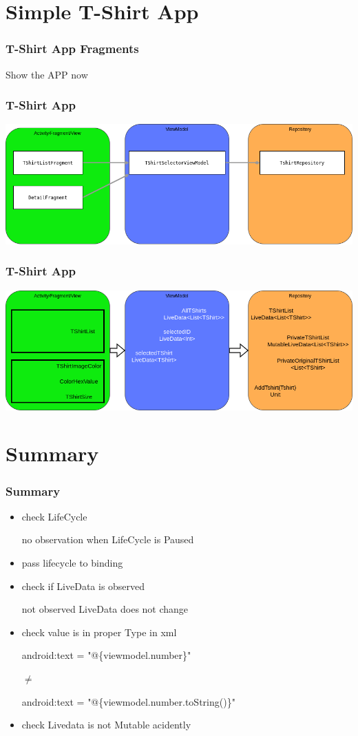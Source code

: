 \documentclass{beamer}
\begin{document}
	\section[My App]{Simple T-Shirt App}
	\begin{frame}
		\frametitle{T-Shirt App Fragments}
		Show the APP now
	\end{frame}
	
	\begin{frame}
		\frametitle{T-Shirt App}
		\includegraphics[width=1\textwidth]{TshirtArchitectureOverview.png}
	\end{frame}
	
	\begin{frame}
		\frametitle{T-Shirt App}
		\includegraphics[width=1\textwidth]{TShirtAppDetailView.png}
	\end{frame}
	
	\section[Summary]{Summary}
	\begin{frame}
		\frametitle{Summary}
		\begin{itemize}
		\item check LifeCycle
		
		no observation when LifeCycle is Paused
		\item pass lifecycle to binding
		\item check if LiveData is observed
		
		not observed LiveData does not change
		\item check value is in proper Type in xml
		
		android:text = "@\{viewmodel.number\}"
		
			$\neq$
		
		android:text = "@\{viewmodel.number.toString()\}" 
		\item check Livedata is not Mutable acidently
		
		\end{itemize}
	\end{frame}
	
\end{document}
